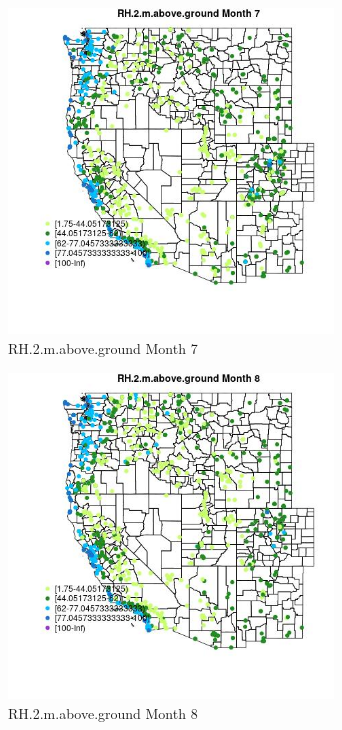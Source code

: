 \begin{figure} 
\centering  
\includegraphics[width=0.77\textwidth]{Code_Outputs/Report_ML_input_PM25_Step4_part_e_de_duplicated_aves_compiled_2019-05-21wNAs_MapObsMo7RH2maboveground.jpg} 
\caption{\label{fig:Report_ML_input_PM25_Step4_part_e_de_duplicated_aves_compiled_2019-05-21wNAsMapObsMo7RH2maboveground}RH.2.m.above.ground Month 7} 
\end{figure} 
 

\clearpage 

\begin{figure} 
\centering  
\includegraphics[width=0.77\textwidth]{Code_Outputs/Report_ML_input_PM25_Step4_part_e_de_duplicated_aves_compiled_2019-05-21wNAs_MapObsMo8RH2maboveground.jpg} 
\caption{\label{fig:Report_ML_input_PM25_Step4_part_e_de_duplicated_aves_compiled_2019-05-21wNAsMapObsMo8RH2maboveground}RH.2.m.above.ground Month 8} 
\end{figure} 
 

